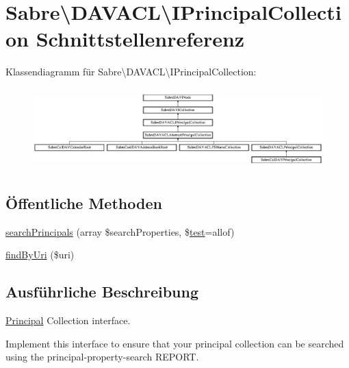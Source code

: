 \hypertarget{interface_sabre_1_1_d_a_v_a_c_l_1_1_i_principal_collection}{}\section{Sabre\textbackslash{}D\+A\+V\+A\+CL\textbackslash{}I\+Principal\+Collection Schnittstellenreferenz}
\label{interface_sabre_1_1_d_a_v_a_c_l_1_1_i_principal_collection}
Klassendiagramm für Sabre\textbackslash{}D\+A\+V\+A\+CL\textbackslash{}I\+Principal\+Collection\+:\begin{figure}[H]
\begin{center}
\leavevmode
\includegraphics[height=3.146067cm]{interface_sabre_1_1_d_a_v_a_c_l_1_1_i_principal_collection}
\end{center}
\end{figure}
\subsection*{Öffentliche Methoden}
\begin{DoxyCompactItemize}
\item 
\mbox{\hyperlink{interface_sabre_1_1_d_a_v_a_c_l_1_1_i_principal_collection_a83dd9fdd55c446e8cc9fad302095f463}{search\+Principals}} (array \$search\+Properties, \$\mbox{\hyperlink{classtest}{test}}=\textquotesingle{}allof\textquotesingle{})
\item 
\mbox{\hyperlink{interface_sabre_1_1_d_a_v_a_c_l_1_1_i_principal_collection_a7b8893f6a37a399cf37afe5dfda85d33}{find\+By\+Uri}} (\$uri)
\end{DoxyCompactItemize}


\subsection{Ausführliche Beschreibung}
\mbox{\hyperlink{class_sabre_1_1_d_a_v_a_c_l_1_1_principal}{Principal}} Collection interface.

Implement this interface to ensure that your principal collection can be searched using the principal-\/property-\/search R\+E\+P\+O\+RT.

